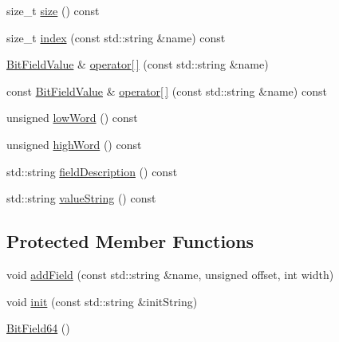 \begin{DoxyCompactItemize}
size\+\_\+t \hyperlink{class_d_d4hep_1_1_d_d_segmentation_1_1_bit_field64_a80ebc3a5fa4f1b961c28bdda5fd528bc}{size} () const
\item 
size\+\_\+t \hyperlink{class_d_d4hep_1_1_d_d_segmentation_1_1_bit_field64_ac195bfa279e2fa29e0a0e987d3f0e7e9}{index} (const std\+::string \&name) const
\item 
\hyperlink{class_d_d4hep_1_1_d_d_segmentation_1_1_bit_field_value}{Bit\+Field\+Value} \& \hyperlink{class_d_d4hep_1_1_d_d_segmentation_1_1_bit_field64_a452aca96e8536e9fc262b7d5255f0e02}{operator\mbox{[}$\,$\mbox{]}} (const std\+::string \&name)
\item 
const \hyperlink{class_d_d4hep_1_1_d_d_segmentation_1_1_bit_field_value}{Bit\+Field\+Value} \& \hyperlink{class_d_d4hep_1_1_d_d_segmentation_1_1_bit_field64_a343b116d9e7b540563387abb6e73133d}{operator\mbox{[}$\,$\mbox{]}} (const std\+::string \&name) const
\item 
unsigned \hyperlink{class_d_d4hep_1_1_d_d_segmentation_1_1_bit_field64_aedf921c57b38c91aa85b946cf1a70818}{low\+Word} () const
\item 
unsigned \hyperlink{class_d_d4hep_1_1_d_d_segmentation_1_1_bit_field64_ad3aaec5213c6d723eb60aec78e957823}{high\+Word} () const
\item 
std\+::string \hyperlink{class_d_d4hep_1_1_d_d_segmentation_1_1_bit_field64_a386f0fdf56eb495e5aa58dd0f64225f6}{field\+Description} () const
\item 
std\+::string \hyperlink{class_d_d4hep_1_1_d_d_segmentation_1_1_bit_field64_a6e50422181dc55535e27740b8020345d}{value\+String} () const
\end{DoxyCompactItemize}
\subsection*{Protected Member Functions}
\begin{DoxyCompactItemize}
\item 
void \hyperlink{class_d_d4hep_1_1_d_d_segmentation_1_1_bit_field64_ae34df46a8957a5a6df76d194889a7d06}{add\+Field} (const std\+::string \&name, unsigned offset, int width)
\item 
void \hyperlink{class_d_d4hep_1_1_d_d_segmentation_1_1_bit_field64_a05fc3d97d522cd5e1d7cf94483c89bc4}{init} (const std\+::string \&init\+String)
\item 
\hyperlink{class_d_d4hep_1_1_d_d_segmentation_1_1_bit_field64_a16079b52f710e962e5f3630f236383d6}{Bit\+Field64} ()
\end{DoxyCompactItemize}
